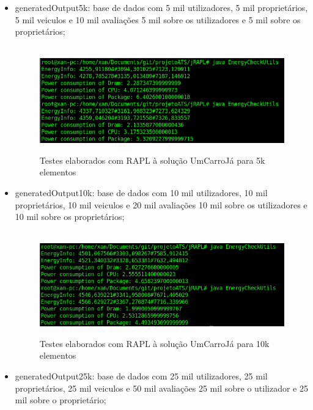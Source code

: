\begin{itemize}
    \item generatedOutput5k: base de dados com 5 mil utilizadores, 5 mil proprietários, 5 mil veiculos e 10 mil avaliações 5 mil sobre os utilizadores e 5 mil sobre os proprietários;
    
        \begin{figure}[H]
            \hbox{\hspace{-8em} \includegraphics[width=1.4\textwidth]{images/rapl_5k.png}}
            \label{fig52}
            \caption{Testes elaborados com RAPL à solução UmCarroJá para 5k elementos}
        \end{figure}
   
    \item generatedOutput10k: base de dados com 10 mil utilizadores, 10 mil proprietários, 10 mil veiculos e 20 mil avaliações 10 mil sobre os utilizadores e 10 mil sobre os proprietários;
    
        \begin{figure}[H]
            \hbox{\hspace{-8em} \includegraphics[width=1.4\textwidth]{images/rapl_10k.png}}
            \label{fig53}
            \caption{Testes elaborados com RAPL à solução UmCarroJá para 10k elementos}
        \end{figure}
        
    \item generatedOutput25k: base de dados com 25 mil utilizadores, 25 mil proprietários, 25 mil veiculos e 50 mil avaliações 25 mil sobre o utilizador e 25 mil sobre o proprietário;
    

\end{itemize}

